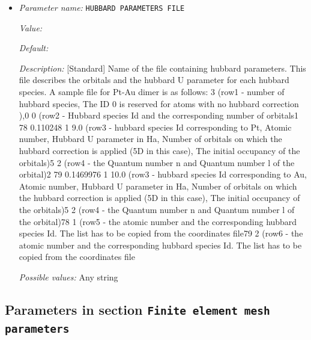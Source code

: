 \begin{itemize}
\item {\it Parameter name:} {\tt HUBBARD PARAMETERS FILE}
\label{parameters:DFT functional parameters/Hubbard Parameters/HUBBARD PARAMETERS FILE}
\label{parameters:DFT_20functional_20parameters/Hubbard_20Parameters/HUBBARD_20PARAMETERS_20FILE}


{\it Value:} 


{\it Default:} 


{\it Description:} [Standard] Name of the file containing hubbard parameters. This file describes the orbitals and the hubbard U parameter for each hubbard species. A sample file for Pt-Au dimer is as follows:  3 (row1 - number of hubbard species, The ID 0 is reserved for atoms with no hubbard correction ),0 0 (row2 - Hubbard species Id and the corresponding number of orbitals1 78 0.110248 1 9.0 (row3 - hubbard species Id corresponding to Pt, Atomic number, Hubbard U parameter in Ha, Number of orbitals on which the hubbard correction is applied (5D in this case), The initial occupancy of the orbitals)5 2 (row4 - the Quantum number n and Quantum number l of the orbital)2 79 0.1469976 1 10.0 (row3 - hubbard species Id corresponding to Au, Atomic number, Hubbard U parameter in Ha, Number of orbitals on which the hubbard correction is applied (5D in this case), The initial occupancy of the orbitals)5 2 (row4 - the Quantum number n and Quantum number l of the orbital)78 1 (row5 - the atomic number and the corresponding hubbard species Id. The list has to be copied from the coordinates file79 2 (row6 - the atomic number and the corresponding hubbard species Id. The list has to be copied from the coordinates file


{\it Possible values:} Any string
\end{itemize}

\subsection{Parameters in section \tt Finite element mesh parameters}
\label{parameters:Finite_20element_20mesh_20parameters}

